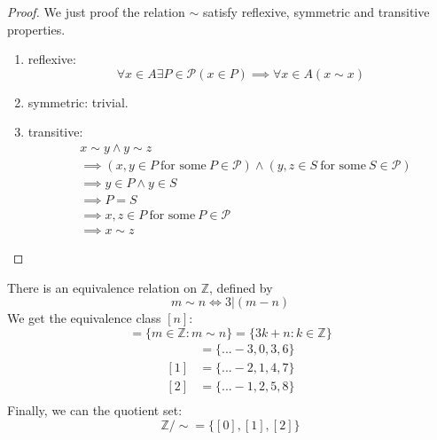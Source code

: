 \begin{proof}
    We just proof the relation $\sim$ satisfy reflexive, symmetric and
    transitive properties.
    \begin{enumerate}

        \item reflexive:
            \begin{equation*}
                \forall x \in A \exists P \in \mathcal{P} (x \in P) \implies
                \forall x \in A (x \sim x)
            \end{equation*}
        \item symmetric: trivial.
        \item transitive:
            \begin{align*}
                &x \sim y \land y \sim z\\
                &\implies (x,y \in P \ \text{for some}\ P \in
                \mathcal{P})\land (y,z \in S \ \text{for some}\ S \in
                \mathcal{P})\\
                &\implies y \in P \land y \in S\\
                &\implies P = S\\
                &\implies x,z \in P \ \text{for some}\ P \in \mathcal{P}\\
                &\implies x \sim z
            \end{align*}

    \end{enumerate}
\end{proof}

\begin{examples}
    There is an equivalence relation on $\mathbb{Z}$, defined by
    \begin{equation*}
        m \sim n \iff 3 | (m - n)
    \end{equation*}
    We get the equivalence class $[n]$:
    \begin{equation*}
        [n] = \{m \in \mathbb{Z}: m \sim n\} = \{3k+n: k \in \mathbb{Z}\}
    \end{equation*}
    \begin{align*}
        [0] &= \{...-3,0,3,6\}\\
        [1] &= \{...-2,1,4,7\}\\
        [2] &= \{...-1,2,5,8\}\\
    \end{align*}
    Finally, we can the quotient set:
    \begin{equation*}
        \mathbb{Z}/\sim = \{[0],[1],[2]\}
    \end{equation*}
\end{examples}

